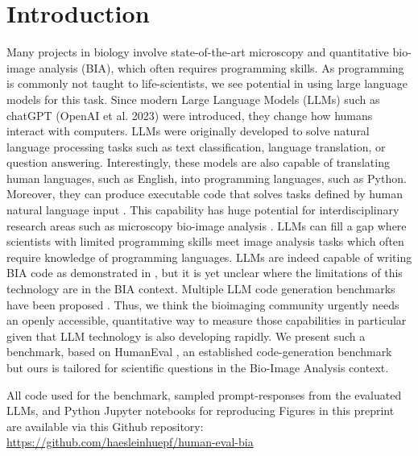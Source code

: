 \documentclass{ecai}
\begin{document}
\begin{frontmatter}
\end{frontmatter}


\section{Introduction}

Many projects in biology involve state-of-the-art microscopy and  quantitative bio-image analysis (BIA), which often requires programming skills. As programming is commonly not taught to life-scientists, we see potential in using large language models for this task. Since modern Large Language Models (LLMs) such as chatGPT (OpenAI et al. 2023) were introduced, they change how humans interact with computers. LLMs were originally developed to solve  natural language processing tasks such as  text classification, language translation, or question answering. Interestingly, these models  are also capable of translating human languages, such as English, into programming languages, such as Python. Moreover, they can produce executable code that solves tasks defined by human natural language input \citep{brown2020language}. This capability has huge potential for interdisciplinary research areas such as microscopy bio-image analysis \citep{Royer2023}. LLMs can fill a gap where scientists with limited programming skills meet image analysis tasks which often require knowledge of programming languages. LLMs are indeed capable of writing BIA code as demonstrated in \citep{royer2023omega}, but it is yet unclear where the limitations of this technology are in the BIA context. Multiple LLM code generation benchmarks have been proposed \citep{chen2021evaluating,austin2021,lai2022ds1000,yadav2024pythonsaga,hendrycks2021measuring}. Thus, we think the bioimaging community urgently needs an openly accessible, quantitative way to measure those capabilities in particular given that LLM technology is also developing rapidly. We present such a benchmark, based on HumanEval \citep{chen2021evaluating}, an established code-generation benchmark but ours is tailored for scientific questions in the Bio-Image Analysis context.

\begin{blind}
All code used for the benchmark, sampled prompt-responses from the evaluated LLMs, and Python Jupyter notebooks for reproducing Figures in this preprint are available via this Github repository:
   \url{https://github.com/haesleinhuepf/human-eval-bia}
\end{blind}
\end{document}
